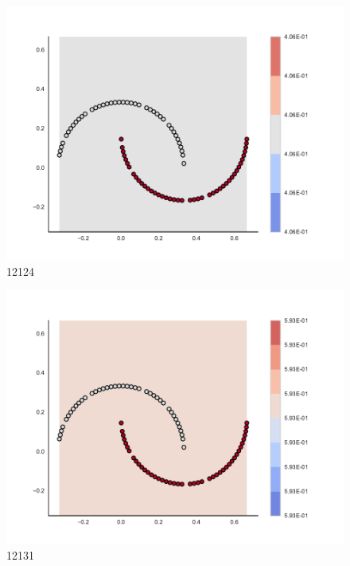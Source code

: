 \begin{subfigure}[b]{0.09\textwidth}
    \includegraphics[clip, trim=2.35cm 1.75cm 4.5cm 0cm,width=\textwidth]{img/convergence/12124.pdf}
    \caption{12124}
    \label{fig:convergence_12124}
\end{subfigure}
%
\begin{subfigure}[b]{0.09\textwidth}
    \includegraphics[clip, trim=2.35cm 1.75cm 4.5cm 0cm,width=\textwidth]{img/convergence/12131.pdf}
    \caption{12131}
    \label{fig:convergence_12131}
\end{subfigure}
%
